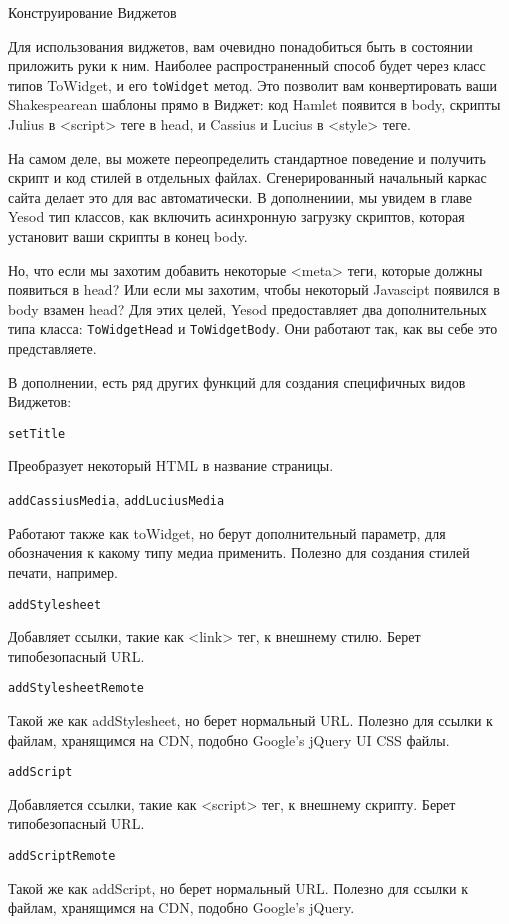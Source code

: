 Конструирование Виджетов

Для использования виджетов, вам очевидно понадобиться быть в состоянии приложить руки к ним. Наиболее распространенный способ будет через класс типов ToWidget, и его \lstinline'toWidget' метод. Это позволит вам конвертировать ваши Shakespearean шаблоны прямо в Виджет: код Hamlet появится в body, скрипты Julius в <script> теге в head, и Cassius и Lucius в <style> теге.

На самом деле, вы можете переопределить стандартное поведение и получить скрипт и код стилей в отдельных файлах. Сгенерированный начальный каркас сайта делает это для вас автоматически. В дополнениии, мы увидем в главе Yesod тип классов, как включить асинхронную загрузку скриптов, которая установит ваши скрипты в конец body. %

Но, что если мы захотим добавить некоторые <meta> теги, которые должны появиться в head? Или если мы захотим, чтобы некоторый Javascipt появился в body взамен head? Для этих целей, Yesod предоставляет два дополнительных типа класса: \lstinline'ToWidgetHead' и \lstinline'ToWidgetBody'. Они работают так, как вы себе это представляете.

В дополнении, есть ряд других функций для создания специфичных видов Виджетов:

\lstinline'setTitle'

Преобразует некоторый HTML в название страницы.

\lstinline'addCassiusMedia', \lstinline'addLuciusMedia'

Работают также как toWidget, но берут дополнительный параметр, для обозначения к какому типу медиа применить. Полезно для создания стилей печати, например.

\lstinline'addStylesheet'

Добавляет ссылки, такие как <link> тег, к внешнему стилю. Берет типобезопасный URL.

\lstinline'addStylesheetRemote'

Такой же как addStylesheet, но берет нормальный URL. Полезно для ссылки к файлам, хранящимся на CDN, подобно Google's jQuery UI CSS файлы.

\lstinline'addScript'

Добавляется ссылки, такие как <script> тег, к внешнему скрипту. Берет типобезопасный URL. 

\lstinline'addScriptRemote'

Такой же как addScript, но берет нормальный URL. Полезно для ссылки к файлам, хранящимся на CDN, подобно Google's jQuery.

